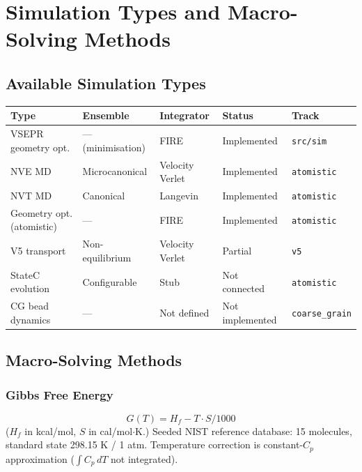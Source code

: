 \documentclass[11pt,a4paper]{article}
\begin{document}
\section{Simulation Types and Macro-Solving Methods}

\subsection{Available Simulation Types}

\begin{center}
\begin{tabular}{lllll}
\toprule
Type & Ensemble & Integrator & Status & Track \\
\midrule
VSEPR geometry opt. & --- (minimisation) & FIRE & \textcolor{green1}{Implemented} & \texttt{src/sim} \\
NVE MD              & Microcanonical     & Velocity Verlet & \textcolor{green1}{Implemented} & \texttt{atomistic} \\
NVT MD              & Canonical          & Langevin        & \textcolor{green1}{Implemented} & \texttt{atomistic} \\
Geometry opt. (atomistic) & ---          & FIRE            & \textcolor{green1}{Implemented} & \texttt{atomistic} \\
V5 transport        & Non-equilibrium    & Velocity Verlet & \textcolor{amber}{Partial}      & \texttt{v5} \\
StateC evolution    & Configurable       & Stub            & \textcolor{red1}{Not connected} & \texttt{atomistic} \\
CG bead dynamics    & ---                & Not defined     & \textcolor{red1}{Not implemented} & \texttt{coarse\_grain} \\
\bottomrule
\end{tabular}
\end{center}

\subsection{Macro-Solving Methods}

\subsubsection{Gibbs Free Energy}
\[
G(T) = H_f - T \cdot S / 1000
\]
($H_f$ in kcal/mol, $S$ in cal/mol$\cdot$K.)
Seeded NIST reference database: 15 molecules, standard state 298.15 K / 1 atm.
Temperature correction is constant-$C_p$ approximation ($\int C_p\,dT$ not integrated).
\end{document}
